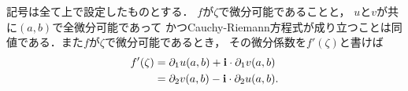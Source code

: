 	\begin{screen}
		\begin{thm}
		\label{thm:differentiable_iff_Cauchy_Riemann_equation_holds}
			記号は全て上で設定したものとする．
			$f$が$\zeta$で微分可能であることと，
			$u$と$v$が共に$(a,b)$で全微分可能であって
			かつCauchy-Riemann方程式が成り立つことは同値である．また$f$が$\zeta$で微分可能であるとき，
			その微分係数を$f'(\zeta)$と書けば
			\begin{align}
				f'(\zeta) &= \partial_1 u(a,b) + \mathbf{i} \cdot \partial_1 v(a,b) \\
				&= \partial_2 v(a,b) - \mathbf{i} \cdot \partial_2 u(a,b).
			\end{align}
		\end{thm}
	\end{screen}
	
